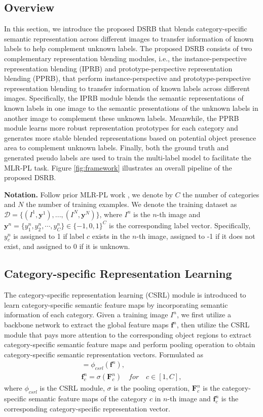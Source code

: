 \documentclass[lettersize,journal]{IEEEtran}
\begin{document}
\subsection{Overview}
In this section, we introduce the proposed DSRB that blends category-specific semantic representation across different images to transfer information of known labels to help complement unknown labels. The proposed DSRB consists of two complementary representation blending modules, i.e., the instance-perspective representation blending (IPRB) and prototype-perspective representation blending (PPRB), that perform instance-perspective and prototype-perspective representation blending to transfer information of known labels across different images. Specifically, the IPRB module blends the semantic representations of known labels in one image to the semantic presentations of the unknown labels in another image to complement these unknown labels. Meanwhile, the PPRB module learns more robust representation prototypes for each category and generates more stable blended representations based on potential object presence area to complement unknown labels. Finally, both the ground truth and generated pseudo labels are used to train the multi-label model to facilitate the MLR-PL task. Figure \ref{fig:framework} illustrates an overall pipeline of the proposed DSRB.

\noindent\textbf{Notation. } Follow prior MLR-PL work \cite{Durand2019CVPR}, we denote by $C$ the number of categories and $N$ the number of training examples. We denote the training dataset as $\mathcal{D}=\{(I^1, \textbf{y}^1), ..., (I^N, \textbf{y}^N)\}$, where $I^n$ is the $n$-th image and $\textbf{y}^n=\{y^n_1, y^n_2, \cdots, y^n_C\}\in \{-1, 0, 1\}^C$ is the corresponding label vector. Specifically, $y^n_c$ is assigned to 1 if label $c$ exists in the $n$-th image, assigned to -1 if it does not exist, and assigned to 0 if it is unknown.

\subsection{Category-specific Representation Learning}
The category-specific representation learning (CSRL) module is introduced to learn category-specific semantic feature maps by incorporating semantic information of each category. Given a training image $I^n$, we first utilize a backbone network to extract the global feature maps $\textbf{f}^n$, then utilize the CSRL module that pays more attention to the corresponding object regions to extract category-specific semantic feature maps and perform pooling operation to obtain category-specific semantic representation vectors. Formulated as 
\begin{gather}
    [\textbf{F}^n_1, \textbf{F}^n_2, \cdots, \textbf{F}^n_C] = \phi_{csrl}(\textbf{f}^n), \\
    \textbf{f}^n_c = \sigma(\textbf{F}^n_c) \quad for \quad c \in [1, C],
\end{gather}
where $\phi_{csrl}$ is the CSRL module, $\sigma$ is the pooling operation, $\textbf{F}^n_c$ is the category-specific semantic feature maps of the category $c$ in $n$-th image and $\textbf{f}^n_c$ is the corresponding category-specific representation vector. 
\end{document}
